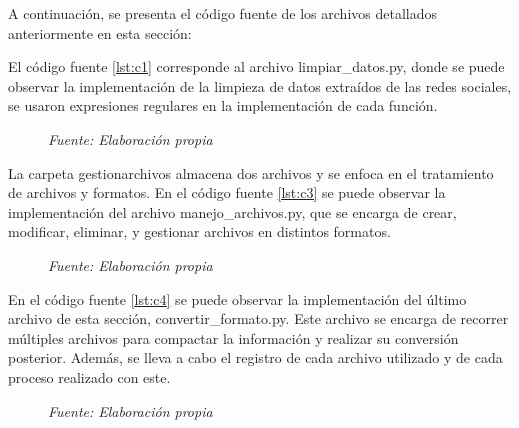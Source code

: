 A continuación, se presenta el código fuente de los archivos detallados anteriormente en esta sección:



El código fuente \ref{lst:c1} corresponde al archivo limpiar\_datos.py, donde se puede observar la implementación de la limpieza de datos extraídos de las redes sociales, se usaron expresiones regulares en la implementación de cada función. 



\vspace{-1.3em} %

\begin{figure}[h!]
	\centering %
	\textit{Fuente: Elaboración propia}
\end{figure}






La carpeta gestionarchivos almacena dos archivos y se enfoca en el tratamiento de archivos y formatos. En el código fuente \ref{lst:c3} se puede observar la implementación del archivo manejo\_archivos.py, que se encarga de crear, modificar, eliminar, y gestionar archivos en distintos formatos.


\vspace{-1.3em} %

\begin{figure}[h!]
	\centering %
	\textit{Fuente: Elaboración propia}
\end{figure}

En el código fuente \ref{lst:c4} se puede observar la implementación del último archivo de esta sección, convertir\_formato.py. Este archivo se encarga de recorrer múltiples archivos para compactar la información y realizar su conversión posterior. Además, se lleva a cabo el registro de cada archivo utilizado y de cada proceso realizado con este.


\vspace{-1.3em} %

\begin{figure}[h!]
	\centering %
	\textit{Fuente: Elaboración propia}
\end{figure}
